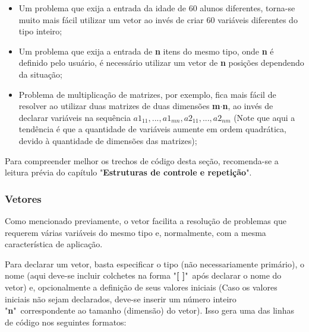 \documentclass[12pt]{article}
\newcommand\tab[1][1cm]{\hspace*{#1}}
\begin{document}
\begin{itemize}
    \item Um problema que exija a entrada da idade de 60 alunos diferentes, torna-se muito mais fácil utilizar um vetor ao invés de criar 60 variáveis diferentes do tipo inteiro;
    \item Um problema que exija a entrada de \textbf{n} itens do mesmo tipo, onde \textbf{n} é definido pelo usuário, é necessário utilizar um vetor de \textbf{n} posições dependendo da situação;
    \item Problema de multiplicação de matrizes, por exemplo, fica mais fácil de resolver ao utilizar duas matrizes de duas dimensões \textbf{m}$\cdot$\textbf{n}, ao invés de declarar variáveis na sequência $a1_{11}, ..., a1_{mn}, a2_{11}, ..., a2_{nm}$ (Note que aqui a tendência é que a quantidade de variáveis aumente em ordem quadrática, devido à quantidade de dimensões das matrizes);
\end{itemize}

\hspace{0.25cm}
\begin{tcolorbox}[colback=violet!5!white,colframe=violet!75!black,title=Dica!]
  \par\tab Para compreender melhor os trechos de código desta seção, recomenda-se a leitura prévia do capítulo "\textbf{Estruturas de controle e repetição}".
\end{tcolorbox}

\subsubsection{Vetores}

\par\tab Como mencionado previamente, o vetor facilita a resolução de problemas que requerem várias variáveis do mesmo tipo e, normalmente, com a mesma característica de aplicação.

\par\tab Para declarar um vetor, basta especificar o tipo (não necessariamente primário), o nome (aqui deve-se incluir colchetes na forma "\textbf{[ ]}"~após declarar o nome do vetor) e, opcionalmente a definição de seus valores iniciais (Caso os valores iniciais não sejam declarados, deve-se inserir um número inteiro "\textbf{n}"~correspondente ao tamanho (dimensão) do vetor). Isso gera uma das linhas de código nos seguintes formatos:
\end{document}
